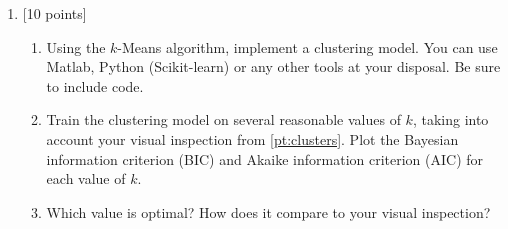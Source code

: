 \documentclass[12pt]{article}
\newenvironment{problem}[2][Problem:]{\begin{trivlist}
\item[\hskip \labelsep {\bfseries #1}\hskip \labelsep {\bfseries #2.}]}{\end{trivlist}}
\begin{document}
\begin{problem}{$K$-Means Clustering [15 points]}
\begin{enumerate}
    \item {[10 points]} 
    \begin{enumerate}
    	\item Using the $k$-Means algorithm, implement a clustering model. You can use Matlab, Python (Scikit-learn) or any other tools at your disposal. Be sure to include code. 
	\item Train the clustering model on several reasonable values of $k$, taking into account your visual inspection from \ref{pt:clusters}. Plot the Bayesian information criterion (BIC) and Akaike information criterion (AIC) for each value of $k$. 
	\item Which value is optimal? How does it compare to your visual inspection?
    \end{enumerate}

\end{enumerate}
\end{problem}
\end{document}
